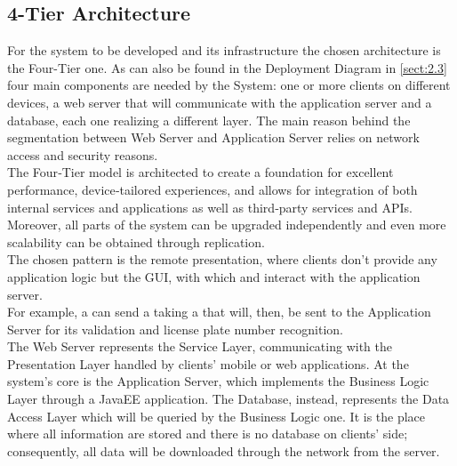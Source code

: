 \documentclass[../../../DD.tex]{subfiles}
\begin{document}
	
	\subsection{4-Tier Architecture\label{subsect:2.6.1}}
	For the system to be developed and its infrastructure the chosen architecture is the Four-Tier one. As can also be found in the Deployment Diagram in \ref{sect:2.3} four main components are needed by the System: one or more clients on different devices, a web server that will communicate with the application server and a database, each one realizing a different layer. The main reason behind the segmentation between Web Server and Application Server relies on network access and security reasons.\\
	The Four‑Tier model is architected to create a foundation for excellent performance, device‑tailored experiences, and allows for integration of both internal services and applications as well as third‑party services and APIs. Moreover, all parts of the system can be upgraded independently and even more scalability can be obtained through replication. \\
	
	The chosen pattern is the remote presentation, where clients don't provide any application logic but the GUI, with which  and  interact with the application server. \\
	For example, a  can send a  taking a  that will, then, be sent to the Application Server for its validation and license plate number recognition. \\
	
	The Web Server represents the Service Layer, communicating with the Presentation Layer handled by clients' mobile or web applications. At the system's core is the Application Server, which implements the Business Logic Layer through a JavaEE application. The Database, instead, represents the Data Access Layer which will be queried by the Business Logic one. It is the place where all information are stored and there is no database on clients' side; consequently, all data will be downloaded through the network from the server.
	
\end{document}
